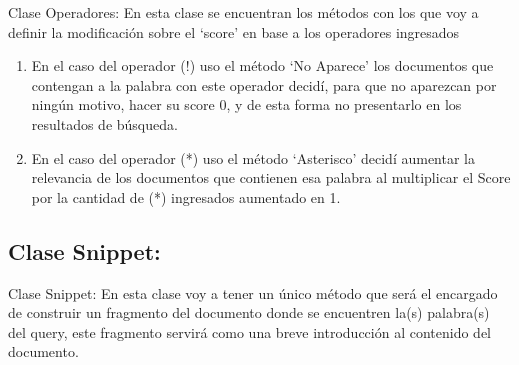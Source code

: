 \documentclass[19pt]{beamer}
\begin{document}
        \begin{frame}{Clase Operadores:}
        En esta clase se encuentran los métodos con los que voy a definir la modificación sobre el ‘score’ en base a los operadores ingresados
        
        \renewcommand{\labelenumi}{$\bigstar$}
        \begin{enumerate}
        	
        	\item En el caso del operador (!) uso el método ‘No Aparece’ los documentos que contengan a la palabra con este operador decidí, para que no aparezcan por ningún motivo, hacer su score 0, y de esta forma no presentarlo en los resultados de búsqueda.
       
        	\item En el caso del operador (*) uso el método ‘Asterisco’ decidí aumentar la relevancia de los documentos que contienen esa palabra al multiplicar el Score por la cantidad de (*) ingresados aumentado en 1.
        	
        \end{enumerate}
    \end{frame}
        
        
   \subsection{Clase Snippet:}
   
        \begin{frame}{Clase Snippet:}
        En esta clase voy a tener un único método que será el encargado de construir un fragmento del documento donde se encuentren la(s) palabra(s) del query, este fragmento servirá como una breve introducción al contenido del documento.
       \end{frame}
      
	
\end{document}
